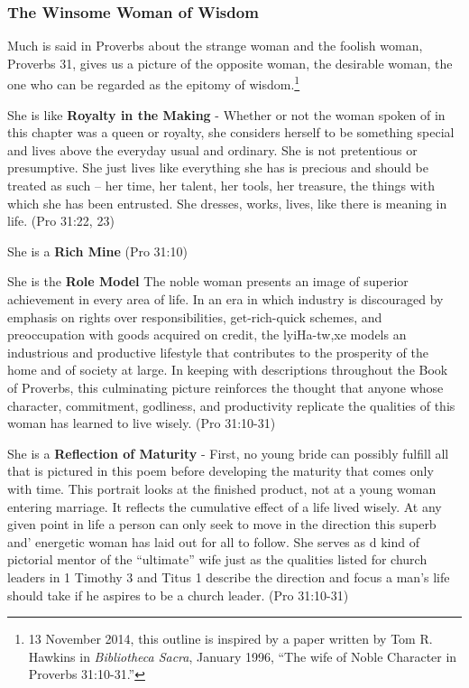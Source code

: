 \subsubsection{The Winsome Woman of Wisdom}
Much is said in Proverbs about the strange woman and the foolish woman, Proverbs 31, gives us a picture of the opposite woman, the desirable woman, the one who can be regarded as the epitomy of wisdom.\footnote{13 November 2014, this outline is inspired by a paper written by Tom R. Hawkins in \emph{Bibliotheca Sacra}, January 1996, ``The wife of Noble Character in Proverbs 31:10-31.''}
\begin{compactenum}
    \item She is like \textbf{Royalty in the Making} - Whether or not the woman spoken of in this chapter was a queen or royalty, she considers herself to be something special and lives above the everyday usual and ordinary.  She is not pretentious or presumptive.  She just lives like everything she has is precious and should be treated as such -- her time, her talent, her tools, her treasure, the things with which she has been entrusted. She dresses, works, lives, like there is meaning in life.  (Pro 31:22, 23) 
    \item She is a \textbf{Rich Mine}  (Pro 31:10) 
    \item She is the \textbf{Role Model} The noble woman presents an image of superior achievement in every area of life. In an era in which industry is discouraged by emphasis on rights over responsibilities, get-rich-quick schemes, and preoccupation with goods acquired on credit, the lyiHa-tw,xe models an industrious and productive lifestyle that contributes to the prosperity of the home and of society at large. In keeping with descriptions throughout the Book of Proverbs, this culminating picture reinforces the thought that anyone whose character, commitment, godliness, and productivity replicate the qualities of this woman has learned to live wisely.  (Pro 31:10-31)  
    \item She is a \textbf{Reflection of Maturity} - First, no young bride can possibly fulfill all that is pictured in this poem before developing the maturity that comes only with time. This portrait looks at the finished product, not at a young woman entering marriage. It reflects the cumulative effect of a life lived wisely. At any given point in life a person can only seek to move in the direction this superb and' energetic woman has laid out for all to follow. She serves as d kind of pictorial mentor of the ``ultimate'' wife just as the qualities listed for church leaders in 1 Timothy 3 and Titus 1 describe the direction and focus a man's life should take if he aspires to be a church leader.  (Pro 31:10-31) 

\end{compactenum}
